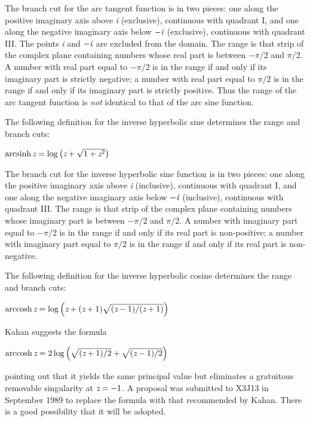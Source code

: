 \begin{flushdesc}
\begin{new}
The branch cut for the arc tangent function is in two pieces:
one along the positive imaginary axis above \emph{i}
(exclusive), continuous with quadrant I, and one along the negative imaginary
axis below $-\emph{i}$ (exclusive), continuous with quadrant III.  
The points \emph{i} and $-\emph{i}$ are excluded from the domain.
The range is that strip of the complex plane containing numbers whose real
part is between $-\pi/2$ and $\pi/2$.  A number with real
part equal to $-\pi/2$ is in the range if and only if its imaginary
part is strictly negative; a number with real part equal to $\pi/2$ is in
the range if and only if its imaginary part is strictly positive.  Thus the range of
the arc tangent function is \emph{not} identical to that of the arc sine function.
\end{new}

\item[\cdf{asinh}]
The following definition for the inverse hyperbolic sine determines
the range and branch cuts:
\begin{tabbing}
$ \mathop\textrm{arcsinh}\nolimits \emph{z}=\log \left(\emph{z}+\sqrt{1+\emph{z}^2}\right)$
\end{tabbing}
The branch cut for the inverse hyperbolic sine function is in two pieces:
one along the positive imaginary axis above \emph{i}
(inclusive), continuous with quadrant I, and one along the negative imaginary
axis below $-\emph{i}$ (inclusive), continuous with quadrant III.
The range is that strip of the complex plane containing numbers whose imaginary
part is between $-\pi/2$ and $\pi/2$.  A number with imaginary
part equal to $-\pi/2$ is in the range if and only if its real
part is non-positive; a number with imaginary part equal to $\pi/2$ is in
the range if and only if its real part is non-negative.

\item[\cdf{acosh}]
The following definition for the inverse hyperbolic cosine
determines the range and branch cuts:
\begin{tabbing}
$ \mathop\textrm{arccosh}\nolimits \emph{z}=\log \left(\emph{z}+(\emph{z}+1)\sqrt{(\emph{z}-1)/(\emph{z}+1)}\right) $
\end{tabbing}

\begin{newer}
Kahan \cite{KAHAN-COMPLEX-FNS} suggests the formula
\begin{tabbing}
$ \mathop\textrm{arccosh}\nolimits \emph{z}=2 \log \left(  \sqrt{(\emph{z}+1)/2} + \sqrt{(\emph{z}-1)/2} \right) $
\end{tabbing}
pointing out that it yields the same principal value but eliminates
a gratuitous removable singularity at $\emph{z}=-1$.
A proposal was submitted to X3J13 in September 1989 to replace the
formula  with that recommended by Kahan.
There is a good possibility that it will be adopted.
\end{newer}


\end{flushdesc}
